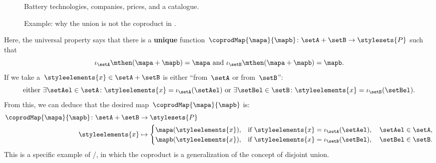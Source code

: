\begin{example}
    \begin{figure*}[tbh]
        \centering
        \caption{Battery technologies, companies, prices, and a catalogue.}
        \label{fig:coprod_batteries_1}
    \end{figure*}

    \begin{figure*}[tbh]
        \centering
        \caption{Example: why the union is not the coproduct in \Set.}
        \label{fig:coprod_batteries_2}
    \end{figure*}

    Here, the universal property says that there is a \textbf{unique} function~$\coprodMap{\mapa}{\mapb}\colon \setA+\setB\to \stylesets{P}$ such that
    \begin{equation}
        \label{eq:exa-batt-factoring-maps}
        \iota_\setA\mthen (\mapa+ \mapb)=\mapa \text{ and }\iota_\setB\mthen (\mapa+ \mapb)=\mapb.
    \end{equation}
    If we take a~$\styleelements{x}\in \setA+\setB$ is either ``from~$\setA$ or from~$\setB$'':
    \begin{equation}
        \label{eq:exa-batt-explain-sum-map}
        \text{either } \exists \setAel\in \setA\colon \styleelements{x}=\iota_\setA(\setAel) \text{ or }\exists \setBel\in \setB\colon \styleelements{x}=\iota_\setB(\setBel).
    \end{equation}
    From this, we can deduce that the desired map~$\coprodMap{\mapa}{\mapb}$ is:
    \begin{equation}
        \label{eq:exa-batt-def-sum-map}
        \begin{aligned}
            \coprodMap{\mapa}{\mapb} \colon  \setA + \setB & \to \stylesets{P} \\
            \styleelements{x}                              & \mapsto
            \begin{cases}
                \mapa(\styleelements{x}), & \text{if } \styleelements{x}=\iota_\setA(\setAel),\quad \setAel \in \setA, \\
                \mapb(\styleelements{x}), & \text{if } \styleelements{x}=\iota_\setB(\setBel),\quad \setBel \in \setB.
            \end{cases}
        \end{aligned}
    \end{equation}
    This is a specific example of \Set/\FinSet, in which the coproduct is a generalization of the concept of disjoint union.

\end{example}
